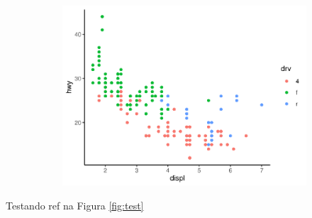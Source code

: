 \begin{figure}[!h]
	\begin{subfigure}{\linewidth}
		\includegraphics{fig/plot}
	\end{subfigure}
\end{figure}

\par Testando ref na Figura \ref{fig:test}
\lipsum[1-10]


